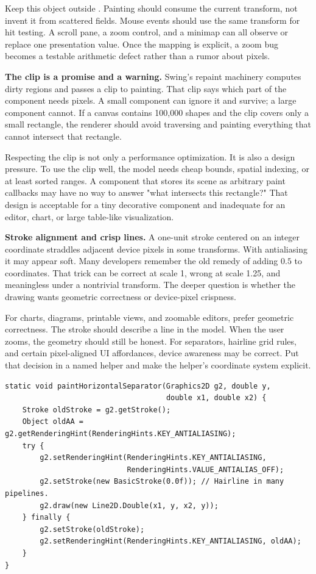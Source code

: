 Keep this object outside . Painting should consume the current transform, not invent it from scattered fields. Mouse events should use the same transform for hit testing. A scroll pane, a zoom control, and a minimap can all observe or replace one presentation value. Once the mapping is explicit, a zoom bug becomes a testable arithmetic defect rather than a rumor about pixels.

\textbf{The clip is a promise and a warning.} Swing's repaint machinery computes dirty regions and passes a clip to painting. That clip says which part of the component needs pixels. A small component can ignore it and survive; a large component cannot. If a canvas contains 100,000 shapes and the clip covers only a small rectangle, the renderer should avoid traversing and painting everything that cannot intersect that rectangle.

Respecting the clip is not only a performance optimization. It is also a design pressure. To use the clip well, the model needs cheap bounds, spatial indexing, or at least sorted ranges. A component that stores its scene as arbitrary paint callbacks may have no way to answer "what intersects this rectangle?" That design is acceptable for a tiny decorative component and inadequate for an editor, chart, or large table-like visualization.

\textbf{Stroke alignment and crisp lines.} A one-unit stroke centered on an integer coordinate straddles adjacent device pixels in some transforms. With antialiasing it may appear soft. Many developers remember the old remedy of adding \(0.5\) to coordinates. That trick can be correct at scale 1, wrong at scale 1.25, and meaningless under a nontrivial transform. The deeper question is whether the drawing wants geometric correctness or device-pixel crispness.

For charts, diagrams, printable views, and zoomable editors, prefer geometric correctness. The stroke should describe a line in the model. When the user zooms, the geometry should still be honest. For separators, hairline grid rules, and certain pixel-aligned UI affordances, device awareness may be correct. Put that decision in a named helper and make the helper's coordinate system explicit.

\begin{lstlisting}[caption={Painting a logical separator while keeping state local.}]
static void paintHorizontalSeparator(Graphics2D g2, double y,
                                     double x1, double x2) {
    Stroke oldStroke = g2.getStroke();
    Object oldAA = g2.getRenderingHint(RenderingHints.KEY_ANTIALIASING);
    try {
        g2.setRenderingHint(RenderingHints.KEY_ANTIALIASING,
                            RenderingHints.VALUE_ANTIALIAS_OFF);
        g2.setStroke(new BasicStroke(0.0f)); // Hairline in many pipelines.
        g2.draw(new Line2D.Double(x1, y, x2, y));
    } finally {
        g2.setStroke(oldStroke);
        g2.setRenderingHint(RenderingHints.KEY_ANTIALIASING, oldAA);
    }
}
\end{lstlisting}

